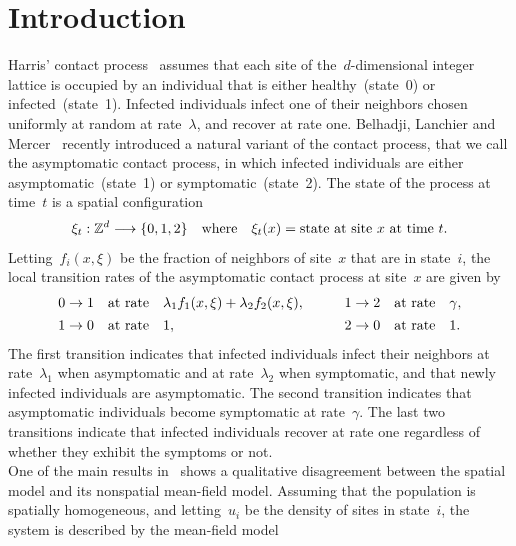 \documentclass[letterpaper,11pt,twoside,keywordsasfootnote,addressatend,noinfoline]{article}
\newcommand{\Z}{\mathbb{Z}}
\begin{document}

\section{Introduction}
\label{sec:intro}
 Harris' contact process~\cite{harris_1974} assumes that each site of the~$d$-dimensional integer lattice is occupied by an individual that is either healthy~(state~0) or infected~(state~1).
 Infected individuals infect one of their neighbors chosen uniformly at random at rate~$\lambda$, and recover at rate one.
 Belhadji, Lanchier and Mercer~\cite{belhadi_lanchier_mercer_2024} recently introduced a natural variant of the contact process, that we call the asymptomatic contact process, in which infected individuals are either asymptomatic~(state~1) or symptomatic~(state~2).
 The state of the process at time~$t$ is a spatial configuration
 $$ \xi_t : \Z^d \longrightarrow \{0, 1, 2 \} \quad \hbox{where} \quad \xi_t (x) = \hbox{state at site~$x$ at time~$t$}. $$
 Letting~$f_i (x, \xi)$ be the fraction of neighbors of site~$x$ that are in state~$i$, the local transition rates of the asymptomatic contact process at site~$x$ are given by
 $$ \begin{array}{rclcrcl}
      0 \to 1 & \hbox{at rate} & \lambda_1 f_1 (x, \xi) + \lambda_2 f_2 (x, \xi), & \quad & 1 \to 2 & \hbox{at rate} & \gamma, \vspace*{4pt} \\
      1 \to 0 & \hbox{at rate} & 1, & \quad & 2 \to 0 & \hbox{at rate} & 1. \end{array} $$
 The first transition indicates that infected individuals infect their neighbors at rate~$\lambda_1$ when asymptomatic and at rate~$\lambda_2$ when symptomatic, and that newly infected individuals are asymptomatic.
 The second transition indicates that asymptomatic individuals become symptomatic at rate~$\gamma$.
 The last two transitions indicate that infected individuals recover at rate one regardless of whether they exhibit the symptoms or not. \\
\indent
 One of the main results in~\cite{belhadi_lanchier_mercer_2024} shows a qualitative disagreement between the spatial model and its nonspatial mean-field model.
 Assuming that the population is spatially homogeneous, and letting~$u_i$ be the density of sites in state~$i$, the system is described by the mean-field model
\end{document}
